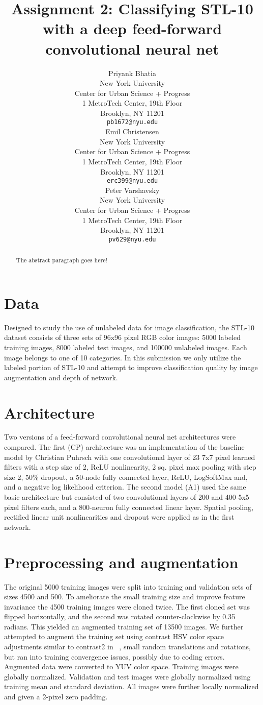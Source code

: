 \documentclass{article} %
\title{Assignment 2: Classifying STL-10 with a deep feed-forward convolutional neural net}
\author{
Priyank Bhatia \\
New York University \\
Center for Urban Science + Progress \\
1 MetroTech Center, 19th Floor \\
Brooklyn, NY 11201 \\
\texttt{pb1672@nyu.edu} \\
\AND
Emil Christensen \\
New York University \\
Center for Urban Science + Progress \\
1 MetroTech Center, 19th Floor \\
Brooklyn, NY 11201 \\
\texttt{erc399@nyu.edu} \\
\And
Peter Varshavsky \\
New York University \\
Center for Urban Science + Progress \\
1 MetroTech Center, 19th Floor \\
Brooklyn, NY 11201 \\
\texttt{pv629@nyu.edu} \\
}
\begin{document}
\maketitle


\begin{abstract}
The abstract paragraph goes here!
\end{abstract}

\section{Data}
\label{data}
Designed to study the use of unlabeled data for image classification, the STL-10 dataset \cite{coates2011analysis} consists of three sets of 96x96 pixel RGB color images: 5000 labeled training images, 8000 labeled test images, and 100000 unlabeled images. Each image belongs to one of 10 categories. In this submission we only utilize the labeled portion of STL-10 and attempt to improve classification quality by image augmentation and depth of network.

\section{Architecture}
\label{arc}
Two versions of a feed-forward convolutional neural net architectures were compared. The first (CP) architecture was an implementation of the baseline model by Christian Puhrsch with one convolutional layer of 23 7x7 pixel learned filters with a step size of 2, ReLU nonlinearity, 2 sq. pixel max pooling with step size 2, 50\% dropout, a 50-node fully connected layer, ReLU, LogSoftMax and, and a negative log likelihood criterion.
The second model (A1) used the same basic architecture but consisted of two convolutional layers of 200 and 400 5x5 pixel filters each, and a 800-neuron fully connected linear layer. Spatial pooling, rectified linear unit nonlinearities and dropout were applied as in the first network.

\section{Preprocessing and augmentation}
\label{preproc}
The original 5000 training images were split into training and validation sets of sizes 4500 and 500. To ameliorate the small training size and improve feature invariance the 4500 training images were cloned twice. The first cloned set was flipped horizontally, and the second was rotated counter-clockwise by 0.35 radians. This yielded an augmented training set of 13500 images. We further attempted to augment the training set using contrast HSV color space adjustments similar to contrast2 in ~\cite{DosovitskiySRB14}, small random translations and rotations, but ran into training convergence issues, possibly due to coding errors. Augmented data were converted to YUV color space. Training images were globally normalized. Validation and test images were globally normalized using training mean and standard deviation. All images were further locally normalized and given a 2-pixel zero padding.
\end{document}
